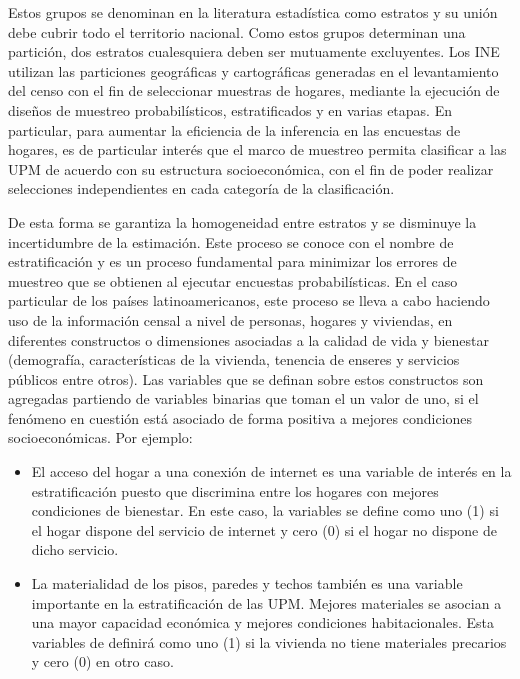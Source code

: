 \documentclass[
  10pt,
  spanish,
]{book}
\providecommand{\tightlist}{%
  \setlength{\itemsep}{0pt}\setlength{\parskip}{0pt}}
\begin{document}
Estos grupos se denominan en la literatura estadística como estratos y su unión debe cubrir todo el territorio nacional. Como estos grupos determinan una partición, dos estratos cualesquiera deben ser mutuamente excluyentes. Los INE utilizan las particiones geográficas y cartográficas generadas en el levantamiento del censo con el fin de seleccionar muestras de hogares, mediante la ejecución de diseños de muestreo probabilísticos, estratificados y en varias etapas. En particular, para aumentar la eficiencia de la inferencia en las encuestas de hogares, es de particular interés que el marco de muestreo permita clasificar a las UPM de acuerdo con su estructura socioeconómica, con el fin de poder realizar selecciones independientes en cada categoría de la clasificación.

De esta forma se garantiza la homogeneidad entre estratos y se disminuye la incertidumbre de la estimación. Este proceso se conoce con el nombre de estratificación y es un proceso fundamental para minimizar los errores de muestreo que se obtienen al ejecutar encuestas probabilísticas. En el caso particular de los países latinoamericanos, este proceso se lleva a cabo haciendo uso de la información censal a nivel de personas, hogares y viviendas, en diferentes constructos o dimensiones asociadas a la calidad de vida y bienestar (demografía, características de la vivienda, tenencia de enseres y servicios públicos entre otros). Las variables que se definan sobre estos constructos son agregadas partiendo de variables binarias que toman el un valor de uno, si el fenómeno en cuestión está asociado de forma positiva a mejores condiciones socioeconómicas. Por ejemplo:

\begin{itemize}
\tightlist
\item
  El acceso del hogar a una conexión de internet es una variable de interés en la estratificación puesto que discrimina entre los hogares con mejores condiciones de bienestar. En este caso, la variables se define como uno (1) si el hogar dispone del servicio de internet y cero (0) si el hogar no dispone de dicho servicio.
\item
  La materialidad de los pisos, paredes y techos también es una variable importante en la estratificación de las UPM. Mejores materiales se asocian a una mayor capacidad económica y mejores condiciones habitacionales. Esta variables de definirá como uno (1) si la vivienda no tiene materiales precarios y cero (0) en otro caso.
\end{itemize}
\end{document}
